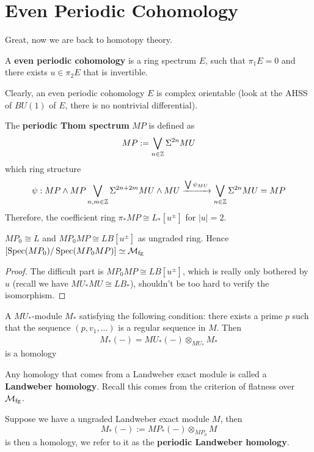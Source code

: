 \section{Even Periodic Cohomology}\label{sec:chromatic-more-landweberexactness}

Great, now we are back to homotopy theory.

\begin{definition}
    A \textbf{even periodic cohomology} is a ring spectrum $E$, such that $\pi_1 E=0$ and there exists $u\in \pi_2 E$ that is invertible. 
\end{definition}
Clearly, an even periodic cohomology $E$ is complex orientable (look at the AHSS of $BU(1)$ of $E$, there is no nontrivial differential).
\begin{definition}
    The \textbf{periodic Thom spectrum} $MP$ is defined as
    \[
    MP:=\bigvee_{n \in \mathbb{Z}} \Sigma^{2n}MU
    \]which ring structure
    \[
    \psi: MP\wedge MP \bigvee_{n,m \in \mathbb{Z}} \Sigma^{2n+2m}MU\wedge MU \xrightarrow{\bigvee \psi_{MU}} \bigvee_{n \in \mathbb{Z}} \Sigma^{2n}MU=MP
    \]
    Therefore, the coefficient ring $\pi_*MP\cong L_*[u^{\pm}]$ for $|u|=2$.
\end{definition}

\begin{proposition}
    $MP_0\cong L$ and $MP_0MP\cong LB[u^{\pm}]$ as ungraded ring. Hence $[\operatorname{\mathrm{Spec}}(MP_0)/\operatorname{\mathrm{Spec}}(MP_0MP)]\simeq \mathcal{M}_{\mathrm{fg}}$
\end{proposition}
\begin{proof}
    The difficult part is $MP_0MP\cong LB[u^{\pm}]$, which is really only bothered by $u$ (recall we have $MU_*MU\cong LB_*$), shouldn't be too hard to verify the isomorphism.
\end{proof}

\begin{theorem}\cite{PreLandweber}
    A $MU_*$-module $M_*$ satisfying the following condition: there exists a prime $p$ such that the sequence $(p,v_1,...)$ is a regular sequence in $M$. Then 
    \begin{align*}
        M_*(-)=MU_*(-)\otimes_{MU_*} M_*
    \end{align*}is a homology
\end{theorem}
    Any homology that comes from a Landweber exact module is called a \textbf{Landweber homology}. Recall this comes from the criterion of flatness over $\mathcal{M}_{\mathrm{fg}}$.

\begin{remark}
    Suppose we have a ungraded Landweber exact module $M$, then 
    \[
    M_*(-):=MP_*(-)\otimes_{MP_0}M
    \]is then a homology, we refer to it as the \textbf{periodic Landweber homology}.
\end{remark}


